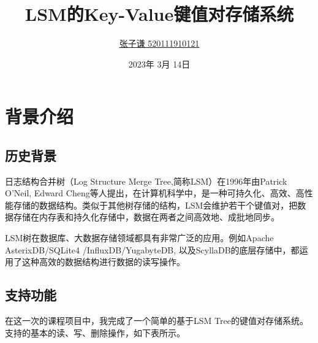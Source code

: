 \documentclass[fontset=windows]{article}
\title{LSM的Key-Value键值对存储系统}
\author{\href{https://github.com/Musicminion}{张子谦 520111910121} }
\date{2023年 3月 14日}
\begin{document}
\hypersetup{hidelinks,
	colorlinks=true,
	allcolors=black,
	pdfstartview=Fit,
	breaklinks=true
}

\maketitle

\section{背景介绍}

\subsection{历史背景}


日志结构合并树（Log Structure Merge Tree,简称LSM）在1996年由Patrick O'Neil, Edward Cheng等人提出，在计算机科学中，是一种可持久化、高效、高性能存储的数据结构。类似于其他树存储的结构，LSM会维护若干个键值对，把数据存储在内存表和持久化存储中，数据在两者之间高效地、成批地同步。

LSM树在数据库、大数据存储领域都具有非常广泛的应用。例如Apache AsterixDB/SQLite4 /InfluxDB/YugabyteDB, 以及ScyllaDB的底层存储中，都运用了这种高效的数据结构进行数据的读写操作。

\subsection{支持功能}
在这一次的课程项目中，我完成了一个简单的基于LSM Tree的键值对存储系统。支持的基本的读、写、删除操作，如下表所示。

\begin{table}[h]
  \centering
  \caption{实现的功能简要介绍}
\end{table}
\end{document}
